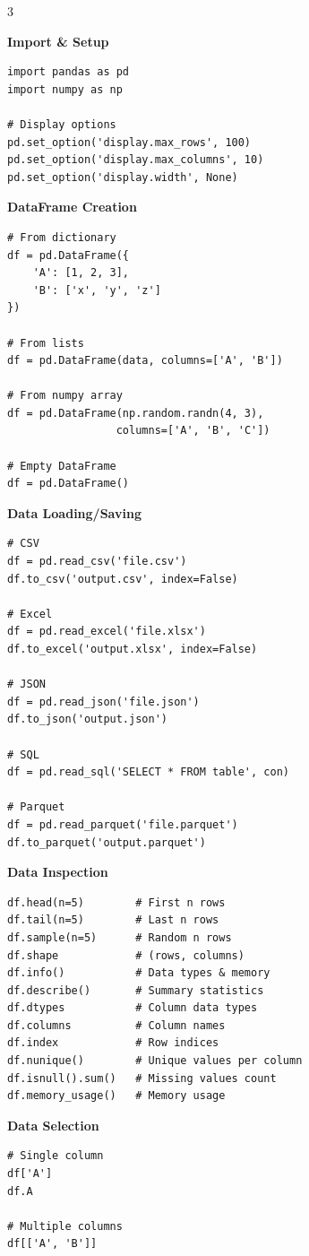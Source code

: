 \documentclass[10pt,landscape,letterpaper]{article}
\newcommand{\sect}[1]{\textbf{\color{blue}#1}}
\begin{document}
\begin{multicols}{3}

\sect{Import \& Setup}
\begin{lstlisting}
import pandas as pd
import numpy as np

# Display options
pd.set_option('display.max_rows', 100)
pd.set_option('display.max_columns', 10)
pd.set_option('display.width', None)
\end{lstlisting}

\sect{DataFrame Creation}
\begin{lstlisting}
# From dictionary
df = pd.DataFrame({
    'A': [1, 2, 3],
    'B': ['x', 'y', 'z']
})

# From lists
df = pd.DataFrame(data, columns=['A', 'B'])

# From numpy array
df = pd.DataFrame(np.random.randn(4, 3),
                 columns=['A', 'B', 'C'])

# Empty DataFrame
df = pd.DataFrame()
\end{lstlisting}

\sect{Data Loading/Saving}
\begin{lstlisting}
# CSV
df = pd.read_csv('file.csv')
df.to_csv('output.csv', index=False)

# Excel
df = pd.read_excel('file.xlsx')
df.to_excel('output.xlsx', index=False)

# JSON
df = pd.read_json('file.json')
df.to_json('output.json')

# SQL
df = pd.read_sql('SELECT * FROM table', con)

# Parquet
df = pd.read_parquet('file.parquet')
df.to_parquet('output.parquet')
\end{lstlisting}

\sect{Data Inspection}
\begin{lstlisting}
df.head(n=5)        # First n rows
df.tail(n=5)        # Last n rows
df.sample(n=5)      # Random n rows
df.shape            # (rows, columns)
df.info()           # Data types & memory
df.describe()       # Summary statistics
df.dtypes           # Column data types
df.columns          # Column names
df.index            # Row indices
df.nunique()        # Unique values per column
df.isnull().sum()   # Missing values count
df.memory_usage()   # Memory usage
\end{lstlisting}

\sect{Data Selection}
\begin{lstlisting}
# Single column
df['A']
df.A

# Multiple columns
df[['A', 'B']]


\end{lstlisting}
\end{multicols}
\end{document}
